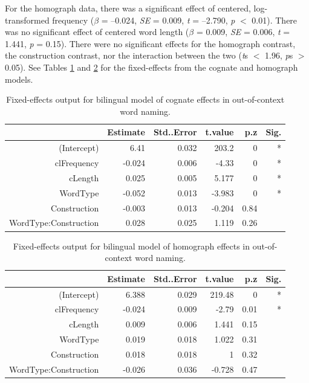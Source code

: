 For the homograph data, there was a significant effect of centered, log-\\transformed frequency (\emph{$\beta$} = --0.024, \emph{SE} = 0.009, \emph{t} = --2.790, \emph{p} $<$ 0.01). There was no significant effect of centered word length (\emph{$\beta$} = 0.009, \emph{SE} = 0.006, \emph{t} = 1.441, \emph{p} = 0.15). There were no significant effects for the homograph contrast, the construction contrast, nor the interaction between the two (\emph{t}s $<$ 1.96, \emph{p}s $>$ 0.05). See Tables \ref{tab:ooc.bil.cog} and \ref{tab:ooc.bil.hom} for the fixed-effects from the cognate and homograph models. 

\begin{table}[htbp]
  \centering
  \caption{Fixed-effects output for bilingual model of cognate effects in out-of-context word naming.}
    \begin{tabular}{rrrrrr}
    \toprule
          & Estimate & Std..Error & t.value & p.z   & Sig. \\
    \midrule
    (Intercept) & 6.41  & 0.032 & 203.2 & 0     & * \\
    clFrequency & -0.024 & 0.006 & -4.33 & 0     & * \\
    cLength & 0.025 & 0.005 & 5.177 & 0     & * \\
    WordType & -0.052 & 0.013 & -3.983 & 0     & * \\
    Construction & -0.003 & 0.013 & -0.204 & 0.84  &  \\
    WordType:Construction & 0.028 & 0.025 & 1.119 & 0.26  &  \\
    \bottomrule
    \end{tabular}%
  \label{tab:ooc.bil.cog}%
\end{table}%


\begin{table}[htbp]
  \centering
  \caption{Fixed-effects output for bilingual model of homograph effects in out-of-context word naming.}
    \begin{tabular}{rrrrrr}
    \toprule
          & Estimate & Std..Error & t.value & p.z   & Sig. \\
    \midrule
    (Intercept) & 6.388 & 0.029 & 219.48 & 0     & * \\
    clFrequency & -0.024 & 0.009 & -2.79 & 0.01  & * \\
    cLength & 0.009 & 0.006 & 1.441 & 0.15  &  \\
    WordType & 0.019 & 0.018 & 1.022 & 0.31  &  \\
    Construction & 0.018 & 0.018 & 1     & 0.32  &  \\
    WordType:Construction & -0.026 & 0.036 & -0.728 & 0.47  &  \\
    \bottomrule
    \end{tabular}%
  \label{tab:ooc.bil.hom}%
\end{table}%


